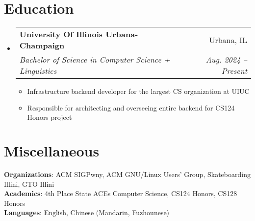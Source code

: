 \documentclass[letterpaper,11pt]{article}
\makeatletter
\newcommand{\resumeItem}[1]{
  \item\small{
    {#1 \vspace{-2pt}}
  }
}
\newcommand{\resumeSubheading}[4]{
  \vspace{-2pt}\item
    \begin{tabular*}{0.97\textwidth}[t]{l@{\extracolsep{\fill}}r}
      \textbf{#1} & #2 \\
      \textit{\small#3} & \textit{\small #4} \\
    \end{tabular*}\vspace{-7pt}
}
\newcommand{\resumeSubHeadingListStart}{\begin{itemize}[leftmargin=0.15in, label={}]}
\newcommand{\resumeSubHeadingListEnd}{\end{itemize}}
\newcommand{\resumeItemListStart}{\begin{itemize}}
\newcommand{\resumeItemListEnd}{\end{itemize}\vspace{-5pt}}
\makeatother
\begin{document}
\section{Education}
  \resumeSubHeadingListStart
    \resumeSubheading
      {University Of Illinois Urbana-Champaign}{Urbana, IL}
      {Bachelor of Science in Computer Science + Linguistics}{Aug. 2024 -- Present}
      \resumeItemListStart
        \resumeItem{Infrastructure backend developer for the largest CS organization at UIUC}
        \resumeItem{Responsible for architecting and overseeing entire backend for CS124 Honors project}
      \resumeItemListEnd

  \resumeSubHeadingListEnd

\section{Miscellaneous}
 \begin{itemize}[leftmargin=0.15in, label={}]
    \small{\item{
     \textbf{Organizations}{: ACM SIGPwny, ACM GNU/Linux Users' Group, Skateboarding Illini, GTO Illini} \\
     \textbf{Academics}{: 4th Place State ACEs Computer Science, CS124 Honors, CS128 Honors} \\
     \textbf{Languages}{: English, Chinese (Mandarin, Fuzhounese)} \\
    }}
 \end{itemize}

\end{document}
